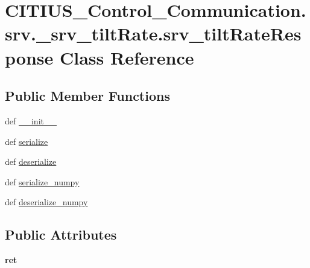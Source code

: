 \hypertarget{class_c_i_t_i_u_s___control___communication_1_1srv_1_1__srv__tilt_rate_1_1srv__tilt_rate_response}{\section{\-C\-I\-T\-I\-U\-S\-\_\-\-Control\-\_\-\-Communication.\-srv.\-\_\-srv\-\_\-tilt\-Rate.\-srv\-\_\-tilt\-Rate\-Response \-Class \-Reference}
\label{class_c_i_t_i_u_s___control___communication_1_1srv_1_1__srv__tilt_rate_1_1srv__tilt_rate_response}
}
\subsection*{\-Public \-Member \-Functions}
\begin{DoxyCompactItemize}
\item 
def \hyperlink{class_c_i_t_i_u_s___control___communication_1_1srv_1_1__srv__tilt_rate_1_1srv__tilt_rate_response_ab509cce85db18373a85a570ad6b4baa9}{\-\_\-\-\_\-init\-\_\-\-\_\-}
\item 
def \hyperlink{class_c_i_t_i_u_s___control___communication_1_1srv_1_1__srv__tilt_rate_1_1srv__tilt_rate_response_a91240a00e297a8bc6cbb75abed281bfd}{serialize}
\item 
def \hyperlink{class_c_i_t_i_u_s___control___communication_1_1srv_1_1__srv__tilt_rate_1_1srv__tilt_rate_response_af58dcd7a25d7258e5d80ef211cb4f23a}{deserialize}
\item 
def \hyperlink{class_c_i_t_i_u_s___control___communication_1_1srv_1_1__srv__tilt_rate_1_1srv__tilt_rate_response_a180d8852444b8288bde0bf03a27eb9f7}{serialize\-\_\-numpy}
\item 
def \hyperlink{class_c_i_t_i_u_s___control___communication_1_1srv_1_1__srv__tilt_rate_1_1srv__tilt_rate_response_a9a658f64c68e8018c35e38ef4795c094}{deserialize\-\_\-numpy}
\end{DoxyCompactItemize}
\subsection*{\-Public \-Attributes}
\begin{DoxyCompactItemize}
\item 
\hypertarget{class_c_i_t_i_u_s___control___communication_1_1srv_1_1__srv__tilt_rate_1_1srv__tilt_rate_response_a4b22a3016f45cdffb9d45a669fa7c29f}{{\bfseries ret}}\label{class_c_i_t_i_u_s___control___communication_1_1srv_1_1__srv__tilt_rate_1_1srv__tilt_rate_response_a4b22a3016f45cdffb9d45a669fa7c29f}

\end{DoxyCompactItemize}
